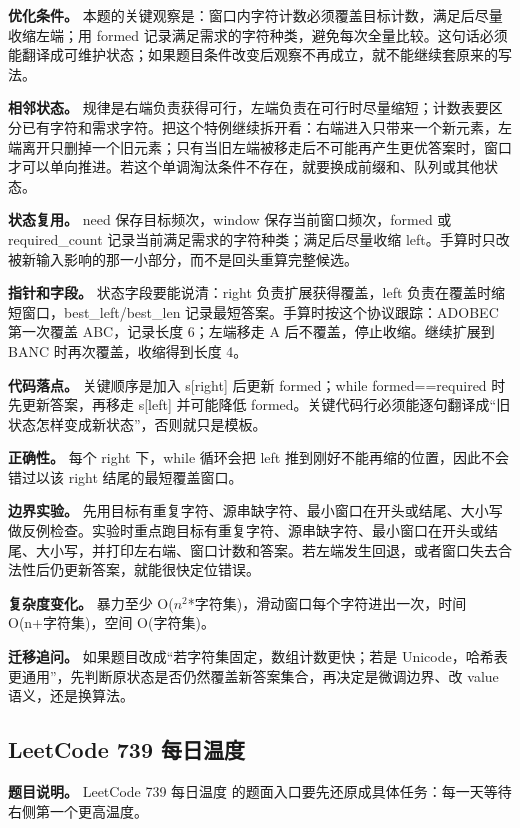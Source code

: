 \textbf{优化条件。} 本题的关键观察是：窗口内字符计数必须覆盖目标计数，满足后尽量收缩左端；用 formed 记录满足需求的字符种类，避免每次全量比较。这句话必须能翻译成可维护状态；如果题目条件改变后观察不再成立，就不能继续套原来的写法。

\textbf{相邻状态。} 规律是右端负责获得可行，左端负责在可行时尽量缩短；计数表要区分已有字符和需求字符。把这个特例继续拆开看：右端进入只带来一个新元素，左端离开只删掉一个旧元素；只有当旧左端被移走后不可能再产生更优答案时，窗口才可以单向推进。若这个单调淘汰条件不存在，就要换成前缀和、队列或其他状态。

\textbf{状态复用。} need 保存目标频次，window 保存当前窗口频次，formed 或 required\_count 记录当前满足需求的字符种类；满足后尽量收缩 left。手算时只改被新输入影响的那一小部分，而不是回头重算完整候选。

\textbf{指针和字段。} 状态字段要能说清：right 负责扩展获得覆盖，left 负责在覆盖时缩短窗口，best\_left/best\_len 记录最短答案。手算时按这个协议跟踪：ADOBEC 第一次覆盖 ABC，记录长度 6；左端移走 A 后不覆盖，停止收缩。继续扩展到 BANC 时再次覆盖，收缩得到长度 4。

\textbf{代码落点。} 关键顺序是加入 s[right] 后更新 formed；while formed==required 时先更新答案，再移走 s[left] 并可能降低 formed。关键代码行必须能逐句翻译成“旧状态怎样变成新状态”，否则就只是模板。

\textbf{正确性。} 每个 right 下，while 循环会把 left 推到刚好不能再缩的位置，因此不会错过以该 right 结尾的最短覆盖窗口。

\textbf{边界实验。} 先用目标有重复字符、源串缺字符、最小窗口在开头或结尾、大小写做反例检查。实验时重点跑目标有重复字符、源串缺字符、最小窗口在开头或结尾、大小写，并打印左右端、窗口计数和答案。若左端发生回退，或者窗口失去合法性后仍更新答案，就能很快定位错误。

\textbf{复杂度变化。} 暴力至少 O(\ensuremath{n^{2}}*字符集)，滑动窗口每个字符进出一次，时间 O(n+字符集)，空间 O(字符集)。

\textbf{迁移追问。} 如果题目改成“若字符集固定，数组计数更快；若是 Unicode，哈希表更通用”，先判断原状态是否仍然覆盖新答案集合，再决定是微调边界、改 value 语义，还是换算法。

\subsection{LeetCode 739 每日温度}

\textbf{题目说明。} LeetCode 739 每日温度 的题面入口要先还原成具体任务：每一天等待右侧第一个更高温度。

